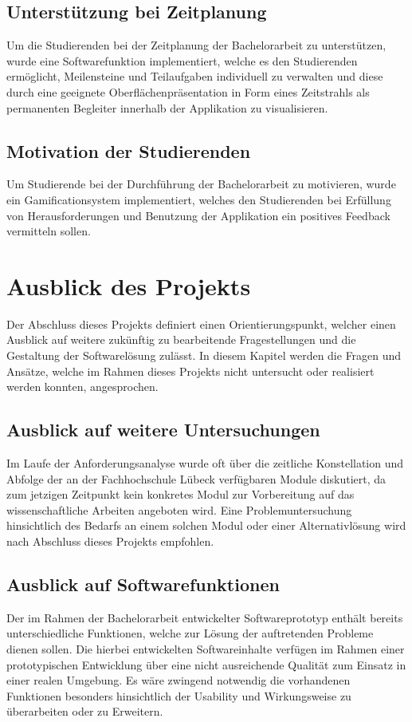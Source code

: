 \documentclass[bibliography=totoc,listof=totoc,BCOR=5mm,DIV=12,oneside]{scrbook}
\begin{document}
\subsection{Unterstützung bei Zeitplanung}
\par Um die Studierenden bei der Zeitplanung der Bachelorarbeit zu unterstützen, wurde eine Softwarefunktion implementiert, welche es den Studierenden ermöglicht, Meilensteine und Teilaufgaben individuell zu verwalten und diese durch eine geeignete Oberflächenpräsentation in Form eines Zeitstrahls als permanenten Begleiter innerhalb der Applikation zu visualisieren.

\subsection{Motivation der Studierenden}
\par Um Studierende bei der Durchführung der Bachelorarbeit zu motivieren, wurde ein Gamificationsystem implementiert, welches den Studierenden bei Erfüllung von Herausforderungen und Benutzung der Applikation ein positives Feedback vermitteln sollen.

\section{Ausblick des Projekts}
\par Der Abschluss dieses Projekts definiert einen Orientierungspunkt, welcher einen Ausblick auf weitere zukünftig zu bearbeitende Fragestellungen und die Gestaltung der Softwarelösung zulässt. In diesem Kapitel werden die Fragen und Ansätze, welche im Rahmen dieses Projekts nicht untersucht oder realisiert werden konnten, angesprochen.

\subsection{Ausblick auf weitere Untersuchungen}
\par Im Laufe der Anforderungsanalyse wurde oft über die zeitliche Konstellation und Abfolge der an der Fachhochschule Lübeck verfügbaren Module diskutiert, da zum jetzigen Zeitpunkt kein konkretes Modul zur Vorbereitung auf das wissenschaftliche Arbeiten angeboten wird. Eine Problemuntersuchung hinsichtlich des Bedarfs an einem solchen Modul oder einer Alternativlösung wird nach Abschluss dieses Projekts empfohlen.

\subsection{Ausblick auf Softwarefunktionen}
\par Der im Rahmen der Bachelorarbeit entwickelter Softwareprototyp enthält bereits unterschiedliche Funktionen, welche zur Lösung der auftretenden Probleme dienen sollen. Die hierbei entwickelten Softwareinhalte verfügen im Rahmen einer prototypischen Entwicklung über eine nicht ausreichende Qualität zum Einsatz in einer realen Umgebung. Es wäre zwingend notwendig die vorhandenen Funktionen besonders hinsichtlich der Usability und Wirkungsweise zu überarbeiten oder zu Erweitern. 
\end{document}
